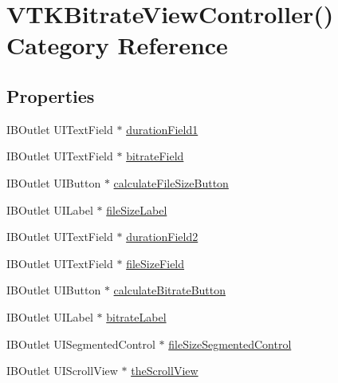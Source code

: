 \hypertarget{category_v_t_k_bitrate_view_controller_07_08}{\section{V\+T\+K\+Bitrate\+View\+Controller() Category Reference}
\label{category_v_t_k_bitrate_view_controller_07_08}
}
\subsection*{Properties}
\begin{DoxyCompactItemize}
\item 
I\+B\+Outlet U\+I\+Text\+Field $\ast$ \hyperlink{category_v_t_k_bitrate_view_controller_07_08_acff0a36c7e5f3051be208ab1ed7851d7}{duration\+Field1}
\item 
I\+B\+Outlet U\+I\+Text\+Field $\ast$ \hyperlink{category_v_t_k_bitrate_view_controller_07_08_a7f677395918cd7188d58e302290c8b81}{bitrate\+Field}
\item 
I\+B\+Outlet U\+I\+Button $\ast$ \hyperlink{category_v_t_k_bitrate_view_controller_07_08_ab6816ccfe5c65c4717d3f5a6414bddd7}{calculate\+File\+Size\+Button}
\item 
I\+B\+Outlet U\+I\+Label $\ast$ \hyperlink{category_v_t_k_bitrate_view_controller_07_08_a659e0d954d37ddedaa9cd9445c701ef3}{file\+Size\+Label}
\item 
I\+B\+Outlet U\+I\+Text\+Field $\ast$ \hyperlink{category_v_t_k_bitrate_view_controller_07_08_a37fa2e54bbf11e3be3e3da9f1b74859f}{duration\+Field2}
\item 
I\+B\+Outlet U\+I\+Text\+Field $\ast$ \hyperlink{category_v_t_k_bitrate_view_controller_07_08_a4cc29123e9b7a76810fbf3c3d842904f}{file\+Size\+Field}
\item 
I\+B\+Outlet U\+I\+Button $\ast$ \hyperlink{category_v_t_k_bitrate_view_controller_07_08_a1e803d315ee50e6c216155e4e1b46cc0}{calculate\+Bitrate\+Button}
\item 
I\+B\+Outlet U\+I\+Label $\ast$ \hyperlink{category_v_t_k_bitrate_view_controller_07_08_a347b6ac7bd388e0492406dfd9baa8585}{bitrate\+Label}
\item 
I\+B\+Outlet U\+I\+Segmented\+Control $\ast$ \hyperlink{category_v_t_k_bitrate_view_controller_07_08_a954b77c570cd18a518d9f46a489c800e}{file\+Size\+Segmented\+Control}
\item 
I\+B\+Outlet U\+I\+Scroll\+View $\ast$ \hyperlink{category_v_t_k_bitrate_view_controller_07_08_abc9eba67908448321fb758b6f1a601f8}{the\+Scroll\+View}
\end{DoxyCompactItemize}


